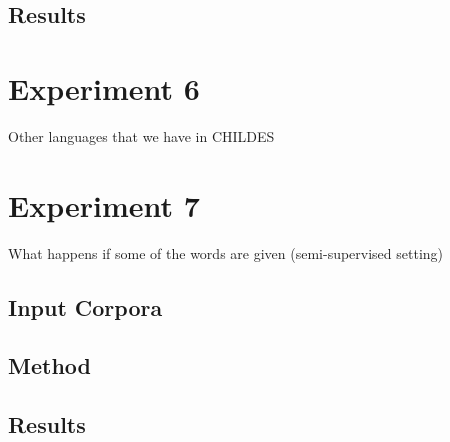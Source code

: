 \subsection{Results}

\section{Experiment 6}
Other languages that we have in CHILDES

\section{Experiment 7}
What happens if some of the words are given (semi-supervised setting)

\subsection{Input Corpora}
\subsection{Method}
\subsection{Results}


